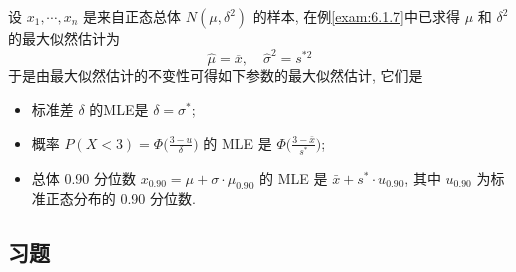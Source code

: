 \begin{example}
设 $x_1,\cdots,x_n$ 是来自正态总体 $N(\mu,\delta^2)$ 的样本, 在例\ref{exam:6.1.7}中已求得 $\mu$ 和 $\delta^2$ 的最大似然估计为
\[\hat{\mu}=\overline{x},\quad\hat{\sigma}^{2}=s^{*2}\]
于是由最大似然估计的不变性可得如下参数的最大似然估计, 它们是
\begin{itemize}
\item 标准差 $\delta$ 的MLE是 $\delta=\sigma^*$;
\item 概率 $P(X<3)=\Phi\big(\frac{3-u}{\delta}\big)$ 的 MLE 是 $\Phi\big(\frac{3-\bar{x}}{s^*}\big)$;
\item 总体 0.90 分位数 $x_{0.90}=\mu+\sigma\cdot\mu_{0.90}$ 的 MLE 是 $\bar{x}+s^{*}\cdot u_{0.90}$, 其中 $u_{0.90}$ 为标准正态分布的 0.90 分位数.
\end{itemize}
\end{example}

\subsection{习题\label{ssec:6.1}} %

